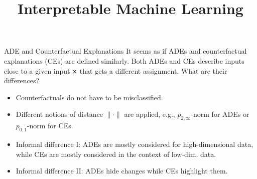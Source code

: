 \documentclass[10pt,compress,t,notes=noshow, xcolor=table]{beamer}
\title{Interpretable Machine Learning}
\date{}
\begin{document}
\newcommand{\vertiii}[1]{{\left\vert\kern-0.25ex\left\vert\kern-0.25ex\left\vert #1 
    \right\vert\kern-0.25ex\right\vert\kern-0.25ex\right\vert}}






\begin{frame}{ADE and Counterfactual Explanations}
It seems as if ADEs and counterfactual explanations (CEs) are defined similarly. Both ADEs and CEs describe inputs close to a given input $\mathbf{x}$ that gets a different assignment. What are their differences?
\begin{itemize}
    \item Counterfactuals do not have to be misclassified.
    \item Different notions of distance $\|\cdot\|$ are applied, e.g., $p_{2,\infty}$-norm for ADEs or $p_{0,1}$-norm for CEs.
    \item Informal difference I: ADEs are mostly considered for high-dimensional data, while CEs are mostly considered in the context of low-dim. data.
    \item Informal difference II: ADEs hide changes while CEs highlight them.
\end{itemize}
\end{frame}
\end{document}
